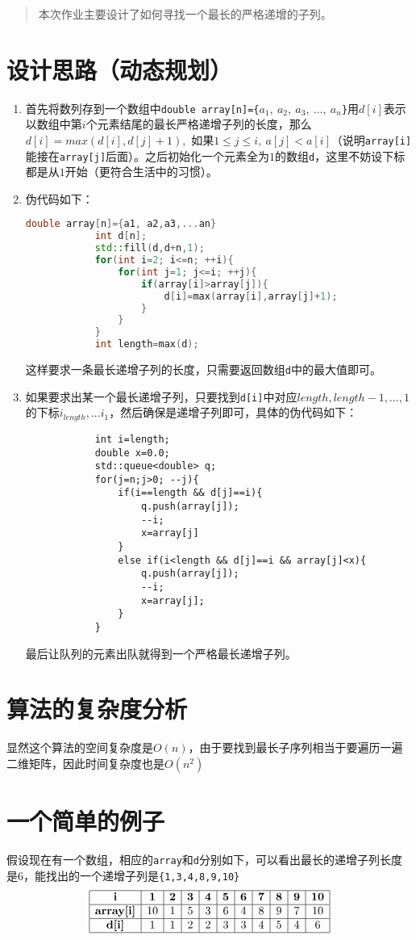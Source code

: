 \documentclass[UTF8]{ctexart}
\begin{document}
	
	\pagestyle{fancy}
	\fancyhead{}
	\rhead{\today}
	\begin{abstract}
		本次作业主要设计了如何寻找一个最长的严格递增的子列。
	\end{abstract}
	\section{设计思路（动态规划）}
	\begin{enumerate}
		\item 首先将数列存到一个数组中\texttt{double array[n]=\{$a_1,\ a_2,\ a_3,\ ...,\ a_n$\}}用$d[i]$表示以数组中第$i$个元素结尾的最长严格递增子列的长度，那么$d[i]=max(d[i],d[j]+1),$ 如果$1 \le j \le i,\ a[j]<a[i]$（说明\texttt{array[i]}能接在\texttt{array[j]}后面）。之后初始化一个元素全为$1$的数组\texttt{d}，这里不妨设下标都是从$1$开始（更符合生活中的习惯）。
		\item 伪代码如下：
		\begin{lstlisting}[language=C++, caption={找到最长递增子列长度}, label={lst:operators}]
			double array[n]={a1, a2,a3,...an}
			int d[n];
			std::fill(d,d+n,1);
			for(int i=2; i<=n; ++i){
				for(int j=1; j<=i; ++j){
					if(array[i]>array[j]){
						d[i]=max(array[i],array[j]+1);
					}
				}
			}
			int length=max(d);
		\end{lstlisting}
		这样要求一条最长递增子列的长度，只需要返回数组\texttt{d}中的最大值即可。
		\item 如果要求出某一个最长递增子列，只要找到\texttt{d[i]}中对应$length,length-1,...,1$的下标$i_{length},...i_1$，然后确保是递增子列即可，具体的伪代码如下：
		\begin{lstlisting}
			int i=length;
			double x=0.0;
			std::queue<double> q;
			for(j=n;j>0; --j){
				if(i==length && d[j]==i){
					q.push(array[j]);
					--i;
					x=array[j]
				}
				else if(i<length && d[j]==i && array[j]<x){
					q.push(array[j]);
					--i;
					x=array[j];
				}
			}
		\end{lstlisting}
		最后让队列的元素出队就得到一个严格最长递增子列。
	\end{enumerate}
\section{算法的复杂度分析}
	显然这个算法的空间复杂度是$O(n)$，由于要找到最长子序列相当于要遍历一遍二维矩阵，因此时间复杂度也是$O(n^2)$
\section{一个简单的例子}
假设现在有一个数组，相应的\texttt{array}和\texttt{d}分别如下，可以看出最长的递增子列长度是6，能找出的一个递增子列是\texttt{\{1,3,4,8,9,10\}}
\[
\begin{array}{|c|c|c|c|c|c|c|c|c|c|c|c|}
	\hline
	\textbf{i}&\textbf{1} & \textbf{2} & \textbf{3} & \textbf{4} & \textbf{5} & \textbf{6} & \textbf{7} & \textbf{8} & \textbf{9} & \textbf{10} \\ \hline
	\textbf{array[i]}&10 & 1 & 5 & 3 & 6 & 4 & 8 & 9 & 7 & 10 \\ \hline
	\textbf{d[i]}& 1 & 1 & 2 & 2 & 3 & 3 & 4 & 5 & 4 & 6 \\ \hline
\end{array}
\]
\end{document}
